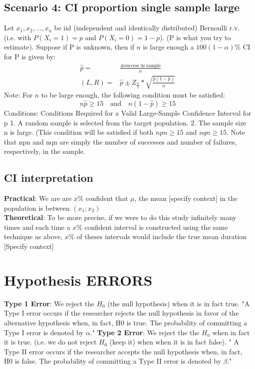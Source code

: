 \documentclass[fontsize=6pt, paper=a4]{scrartcl}
\begin{document}
\begin{multicols*}{4}
{\subsection{Scenario 4: CI proportion single sample large}
Let $x_1,x_2,...,x_n$ be iid (independent and identically distributed) Bernoulli r.v. (i.e. with $P(X_i=1)=p$ and $P(X_i=0)=1-p$). (P is what you try to estimate). Suppose if P is unknown, then if $n$ is large enough a $100(1-\alpha)\%$ CI for P is given by:
\begin{align}
	\widehat{p}=& \frac{\# \textrm{success in sample}}{n} \\
	(L,R)=& \widehat{p} \pm Z_{\frac{\alpha}{2}}*\sqrt{\frac{\widehat{p}(1-\widehat{p})}{n}}
\end{align}
Note: For $n$ to be large enough, the following condition must be satisfied:
\begin{equation}
	n\widehat{p} \geq  15 \quad \textrm{and} \quad
	n(1-\widehat{p}) \geq  15
\end{equation}
Conditions: Conditions Required for a Valid Large-Sample Confidence Interval for p
1. A random sample is selected from the target population.
2. The sample size n is large. (This condition will be satisfied if both $npn \geq 15$ and $nqn \geq 15$. Note that npn and nqn are simply the number of successes and number of failures, respectively, in the sample.

\subsection{CI interpretation}
\textbf{Practical}: We are are $x\%$ confident that $\mu$, the mean [specify context] in the population is between $(x_1;x_2)$\\
\textbf{Theoretical}: To be more precise, if we were to do this study infinitely many times and each time a $x\%$ confident interval is constructed using the same technique as above, $x\%$ of theses intervals would include the true mean duration [Specify context]

\section{Hypothesis ERRORS}
\textbf{Type 1 Error}: We reject the $H_0$ (the null hypothesis) when it is in fact true. "A Type I error occurs if the researcher rejects the null hypothesis in favor of the alternative hypothesis when, in fact, H0 is true. The probability of committing a Type I error is denoted by $\alpha$."
\textbf{Type 2 Error}: We reject the the $H_a$ when in fact it is true. (i.e. we do not reject $H_0$ (keep it) when when it is in fact false). " A Type II error occurs if the researcher accepts the null hypothesis when, in fact, H0 is false. The probability of committing a Type II error is denoted by $\beta$."
}
\end{multicols*}
\end{document}
